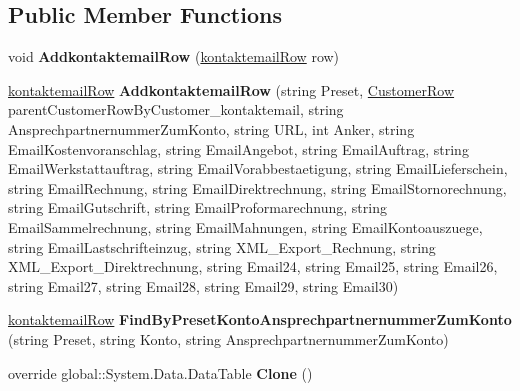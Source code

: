 \subsection*{Public Member Functions}
\begin{DoxyCompactItemize}
\item 
void {\bfseries Addkontaktemail\+Row} (\hyperlink{class_products_1_1_data_1_1ds_sage_1_1kontaktemail_row}{kontaktemail\+Row} row)\hypertarget{class_products_1_1_data_1_1ds_sage_1_1kontaktemail_data_table_a6268b69e3617c59bdbcb7554d63f6837}{}\label{class_products_1_1_data_1_1ds_sage_1_1kontaktemail_data_table_a6268b69e3617c59bdbcb7554d63f6837}

\item 
\hyperlink{class_products_1_1_data_1_1ds_sage_1_1kontaktemail_row}{kontaktemail\+Row} {\bfseries Addkontaktemail\+Row} (string Preset, \hyperlink{class_products_1_1_data_1_1ds_sage_1_1_customer_row}{Customer\+Row} parent\+Customer\+Row\+By\+Customer\+\_\+kontaktemail, string Ansprechpartnernummer\+Zum\+Konto, string U\+RL, int Anker, string Email\+Kostenvoranschlag, string Email\+Angebot, string Email\+Auftrag, string Email\+Werkstattauftrag, string Email\+Vorabbestaetigung, string Email\+Lieferschein, string Email\+Rechnung, string Email\+Direktrechnung, string Email\+Stornorechnung, string Email\+Gutschrift, string Email\+Proformarechnung, string Email\+Sammelrechnung, string Email\+Mahnungen, string Email\+Kontoauszuege, string Email\+Lastschrifteinzug, string X\+M\+L\+\_\+\+Export\+\_\+\+Rechnung, string X\+M\+L\+\_\+\+Export\+\_\+\+Direktrechnung, string Email24, string Email25, string Email26, string Email27, string Email28, string Email29, string Email30)\hypertarget{class_products_1_1_data_1_1ds_sage_1_1kontaktemail_data_table_ae12762693f1897f9a307e822708ae9ea}{}\label{class_products_1_1_data_1_1ds_sage_1_1kontaktemail_data_table_ae12762693f1897f9a307e822708ae9ea}

\item 
\hyperlink{class_products_1_1_data_1_1ds_sage_1_1kontaktemail_row}{kontaktemail\+Row} {\bfseries Find\+By\+Preset\+Konto\+Ansprechpartnernummer\+Zum\+Konto} (string Preset, string Konto, string Ansprechpartnernummer\+Zum\+Konto)\hypertarget{class_products_1_1_data_1_1ds_sage_1_1kontaktemail_data_table_a0e33d3c8c410eaea4a8366658e265e5a}{}\label{class_products_1_1_data_1_1ds_sage_1_1kontaktemail_data_table_a0e33d3c8c410eaea4a8366658e265e5a}

\item 
override global\+::\+System.\+Data.\+Data\+Table {\bfseries Clone} ()\hypertarget{class_products_1_1_data_1_1ds_sage_1_1kontaktemail_data_table_a55c4e881a90fff1aad9e602cca0c47c1}{}\label{class_products_1_1_data_1_1ds_sage_1_1kontaktemail_data_table_a55c4e881a90fff1aad9e602cca0c47c1}


\end{DoxyCompactItemize}
